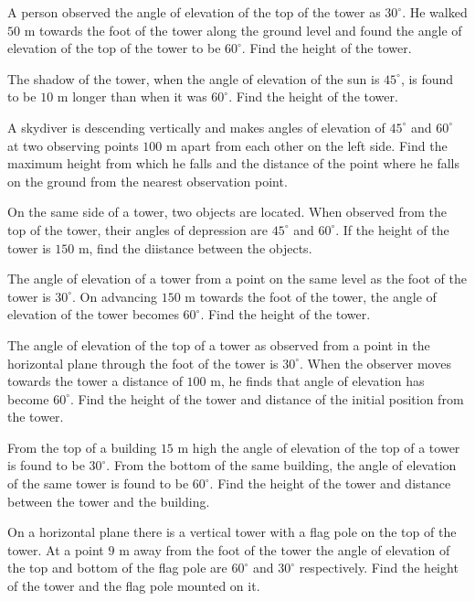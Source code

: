 \item A person observed the angle of elevation of the top of the tower as $30^\circ$. He walked $50$ m towards the foot
  of the tower along the ground level and found the angle of elevation of the top of the tower to be $60^\circ$. Find the
  height of the tower.

\item The shadow of the tower, when the angle of elevation of the sun is $45^\circ$, is found to be $10$ m longer than
  when it was $60^\circ$. Find the height of the tower.

\item A skydiver is descending vertically and makes angles of elevation of $45^\circ$ and $60^\circ$ at two observing
  points $100$ m apart from each other on the left side. Find the maximum height from which he falls and the distance of
  the point where he falls on the ground from the nearest observation point.

\item On the same side of a tower, two objects are located. When observed from the top of the tower, their angles of depression are
  $45^\circ$ and $60^\circ$. If the height of the tower is $150$ m, find the diistance between the objects.

\item The angle of elevation of a tower from a point on the same level as the foot of the tower is $30^\circ$. On advancing
  $150$ m towards the foot of the tower, the angle of elevation of the tower becomes $60^\circ$. Find the height of
  the tower.

\item The angle of elevation of the top of a tower as observed from a point in the horizontal plane through the foot of the tower is
  $30^\circ$. When the observer moves towards the tower a distance of $100$ m, he finds that angle of elevation has
  become $60^\circ$. Find the height of the tower and distance of the initial position from the tower.

\item From the top of a building $15$ m high the angle of elevation of the top of a tower is found to be $30^\circ$. From
  the bottom of the same building, the angle of elevation of the same tower is found to be $60^\circ$. Find the height of
  the tower and distance between the tower and the building.

\item On a horizontal plane there is a vertical tower with a flag pole on the top of the tower. At a point $9$ m away from the
  foot of the tower the angle of elevation of the top and bottom of the flag pole are $60^\circ$ and $30^\circ$
  respectively. Find the height of the tower and the flag pole mounted on it.

